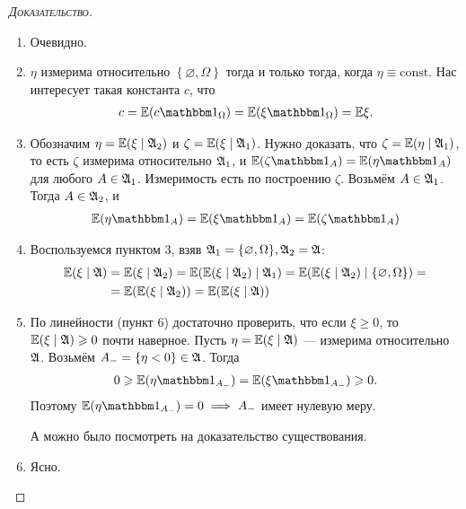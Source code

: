 \documentclass[../main.tex]{subfiles}
\begin{document}
\begin{proof}[\normalfont\textsc{Доказательство}]\
 \begin{enumerate}
  \item Очевидно.
  \item $ \eta $ измерима относительно $ \left\{ \varnothing, \Omega \right\} $ тогда и только тогда, когда $ \eta \equiv \mathrm{const} $. Нас интересует такая константа $ c $, что
   \begin{align*}
    c = \E(c \Ind_\Omega) = \E(\xi \Ind_\Omega) = \E\xi.
   \end{align*}
  \item Обозначим $ \eta = \mathbb E(\xi \mid \mathfrak A_2) $ и $ \zeta = \mathbb E(\xi \mid \mathfrak A_1) $. Нужно доказать, что $ \zeta = \mathbb E(\eta \mid \mathfrak A_1) $, то есть $ \zeta $ измерима относительно $ \mathfrak A_1 $, и $ \E(\zeta\Ind_A) = \E(\eta\Ind_A) $ для любого $ A \in \mathfrak A_1 $. Измеримость есть по построению $ \zeta $. Возьмём $ A \in \mathfrak A_1 $. Тогда $ A \in \mathfrak A_2 $, и
   \begin{align*}
    \E(\eta \Ind_A) = \E(\xi\Ind_A) = \E(\zeta \Ind_A)
   \end{align*}

\item Воспользуемся пунктом 3, взяв $\mathfrak A_1 = \{ \varnothing, \Omega \}, \mathfrak A_2 = \mathfrak A$:
	\begin{align*}
		\mathbb E(\xi \mid \mathfrak A) &= \mathbb E(\xi \mid \mathfrak A_2) = \mathbb E(\mathbb E(\xi \mid \mathfrak A_2) \mid \mathfrak A_1) = \mathbb E(\mathbb E(\xi \mid \mathfrak A_2) \mid \{ \varnothing, \Omega\}) = \\ 
		&= \mathbb E(\mathbb E(\xi \mid \mathfrak A_2)) = \mathbb E(\mathbb E(\xi \mid \mathfrak A))
	\end{align*}
  \item По линейности (пункт 6) достаточно проверить, что если $ \xi \geqslant 0 $, то $ \mathbb E(\xi \mid \mathfrak A) \geqslant 0 $ почти наверное. Пусть $ \eta = \mathbb E(\xi \mid \mathfrak A) $ --- измерима относительно $ \mathfrak A $. Возьмём $ A_- = \left\{ \eta < 0 \right\} \in \mathfrak A $. Тогда 
   \begin{align*}
    0\geqslant \E(\eta \Ind_{A_-}) = \E(\xi\Ind_{A_-}) \geqslant 0.
   \end{align*} Поэтому $ \E(\eta \Ind_{A_-}) = 0 \implies A_- $ имеет нулевую меру.

   А можно было посмотреть на доказательство существования.
  \item Ясно.
 \end{enumerate}
\end{proof}
\end{document}
